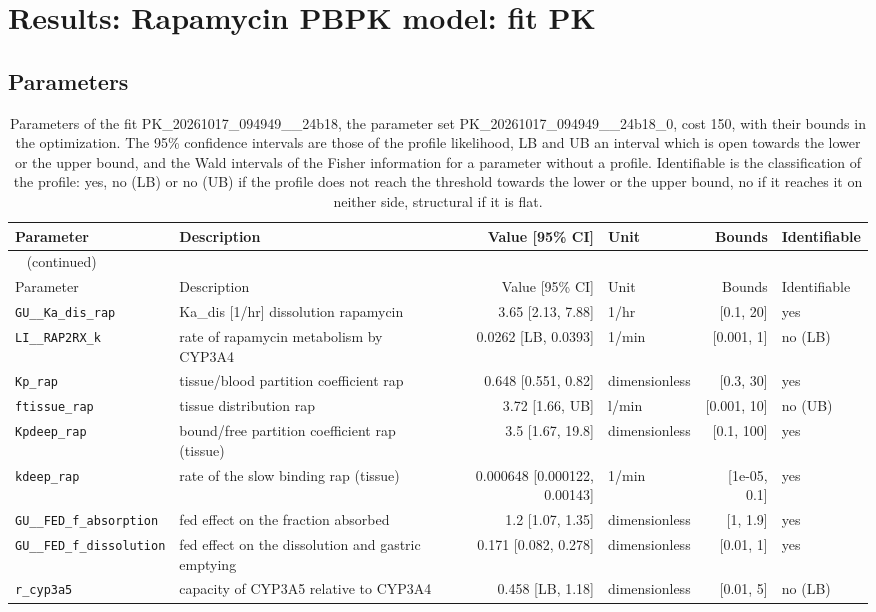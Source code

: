 \section{Results: Rapamycin PBPK model: fit PK}

\subsection{Parameters}

\begin{longtable}{llrlrl}
\caption{Parameters of the fit PK\_20261017\_094949\_\_24b18, the parameter set PK\_20261017\_094949\_\_24b18\_0, cost 150, with their bounds in the optimization. The 95\% confidence intervals are those of the profile likelihood, LB and UB an interval which is open towards the lower or the upper bound, and the Wald intervals of the Fisher information for a parameter without a profile. Identifiable is the classification of the profile: yes, no (LB) or no (UB) if the profile does not reach the threshold towards the lower or the upper bound, no if it reaches it on neither side, structural if it is flat.}\label{tab:parameters:PK_20261017_094949__24b18} \\
\toprule
Parameter & Description & Value [95\% CI] & Unit & Bounds & Identifiable \\
\midrule
\endfirsthead
\multicolumn{6}{l}{\small\tablename~\thetable{} (continued)} \\
\toprule
Parameter & Description & Value [95\% CI] & Unit & Bounds & Identifiable \\
\midrule
\endhead
\bottomrule
\endlastfoot
\texttt{GU\_\_Ka\_dis\_rap} & Ka\_dis [1/hr] dissolution rapamycin & 3.65 [2.13, 7.88] & 1/hr & [0.1, 20] & yes \\
\texttt{LI\_\_RAP2RX\_k} & rate of rapamycin metabolism by CYP3A4 & 0.0262 [LB, 0.0393] & 1/min & [0.001, 1] & no (LB) \\
\texttt{Kp\_rap} & tissue/blood partition coefficient rap & 0.648 [0.551, 0.82] & dimensionless & [0.3, 30] & yes \\
\texttt{ftissue\_rap} & tissue distribution rap & 3.72 [1.66, UB] & l/min & [0.001, 10] & no (UB) \\
\texttt{Kpdeep\_rap} & bound/free partition coefficient rap (tissue) & 3.5 [1.67, 19.8] & dimensionless & [0.1, 100] & yes \\
\texttt{kdeep\_rap} & rate of the slow binding rap (tissue) & 0.000648 [0.000122, 0.00143] & 1/min & [1e-05, 0.1] & yes \\
\texttt{GU\_\_FED\_f\_absorption} & fed effect on the fraction absorbed & 1.2 [1.07, 1.35] & dimensionless & [1, 1.9] & yes \\
\texttt{GU\_\_FED\_f\_dissolution} & fed effect on the dissolution and gastric emptying & 0.171 [0.082, 0.278] & dimensionless & [0.01, 1] & yes \\
\texttt{r\_cyp3a5} & capacity of CYP3A5 relative to CYP3A4 & 0.458 [LB, 1.18] & dimensionless & [0.01, 5] & no (LB) \\
\end{longtable}

